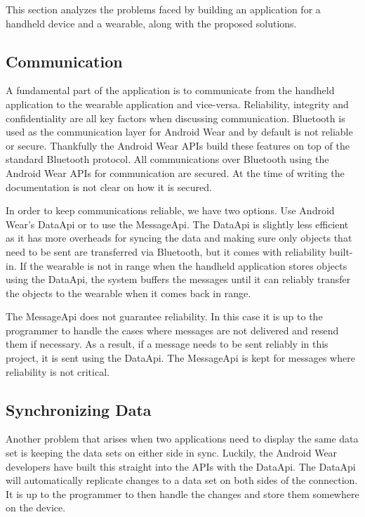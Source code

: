 This section analyzes the problems faced by building an application for a
handheld device and a wearable, along with the proposed solutions.

\subsection{Communication}

A fundamental part of the application is to communicate from the handheld
application to the wearable application and vice-versa. Reliability, integrity
and confidentiality are all key factors when discussing communication. Bluetooth
is used as the communication layer for Android Wear and by default is not
reliable or secure. Thankfully the Android Wear APIs build these features on top
of the standard Bluetooth protocol. All communications over Bluetooth using the
Android Wear APIs for communication are secured. At the time of writing the
documentation is not clear on how it is secured.

In order to keep communications reliable, we have two options. Use Android
Wear's DataApi or to use the MessageApi. The DataApi is slightly less efficient
as it has more overheads for syncing the data and making sure only objects that
need to be sent are transferred via Bluetooth, but it comes with reliability
built-in. If the wearable is not in range when the handheld application stores
objects using the DataApi, the system buffers the messages until it can reliably
transfer the objects to the wearable when it comes back in range.

The MessageApi does not guarantee reliability. In this case it is up to the
programmer to handle the cases where messages are not delivered and resend them
if necessary. As a result, if a message needs to be sent reliably in this
project, it is sent using the DataApi. The MessageApi is kept for messages where
reliability is not critical.

\subsection{Synchronizing Data}

Another problem that arises when two applications need to display the same data
set is keeping the data sets on either side in sync. Luckily, the Android Wear
developers have built this straight into the APIs with the DataApi. The DataApi
will automatically replicate changes to a data set on both sides of the
connection. It is up to the programmer to then handle the changes and store
them somewhere on the device.

